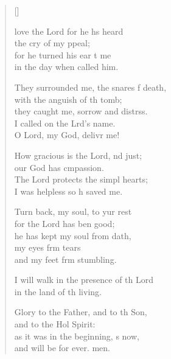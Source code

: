 \settowidth{\versewidth}{They surrounded me, the snares of death, *}
\begin{verse}[\versewidth]
  \begin{patverse}
 love the Lord for he hs heard\Med\\
the cry of my ppeal;\\
for he turned his ear t me\Med\\
in the day when  called him.

They surrounded me, the snares f death,\Med\\
with the anguish of th tomb;\\
they caught me, sorrow and distrss.\Flex\\
I called on the Lrd’s name.\Med\\
O Lord, my God, delivr me!

How gracious is the Lord, nd just;\Med\\
our God has cmpassion.\\
The Lord protects the simpl hearts;\Med\\
I was helpless so h saved me.

Turn back, my soul, to yur rest\Med\\
for the Lord has ben good;\\
he has kept my soul from dath,\Flex\\
my eyes frm tears\Med\\
and my feet frm stumbling.

I will walk in the presence of th Lord\Med\\
in the land of th living.

Glory to the Father, and to th Son,\Med\\
and to the Hol Spirit:\\
as it was in the beginning, \pointup{\i}s now,\Med\\
and will be for ever. men.
  \end{patverse}
\end{verse}
